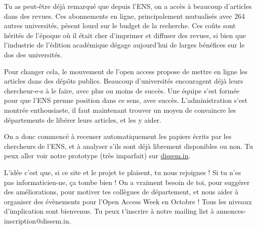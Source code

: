 
Tu as peut-être déjà remarqué que depuis l'ENS, on a accès à beaucoup d'articles dans des revues. Ces abonnements en ligne, principalement mutualisés avec 264 autres universités, pèsent lourd sur le budget de la recherche. Ces coûts sont hérités de l'époque où il était cher d'imprimer et diffuser des revues, si bien que l'industrie de l'édition académique dégage aujourd'hui de larges bénéfices sur le dos des universités.

Pour changer cela, le mouvement de l'open access propose de mettre en ligne les articles dans des dépôts publics. Beaucoup d'universités encouragent déjà leurs chercheur-e-s à le faire, avec plus ou moins de succès. Une équipe s'est formée pour que l'ENS prenne position dans ce sens, avec succès. L'administration s'est montrée enthousiaste, il faut maintenant trouver un moyen de convaincre les départements de libérer leurs articles, et les y aider.

On a donc commencé à recenser automatiquement les papiers écrits par les chercheurs de l'ENS, et à analyser s'ils sont déjà librement disponibles ou non.
Tu peux aller voir notre prototype (très imparfait) sur \url{dissem.in}. 

L'idée c'est que, si ce site et le projet te plaisent, tu nous rejoignes ! Si tu n'es pas informaticien-ne, ça tombe bien ! On a vraiment besoin de toi, pour suggérer des améliorations, pour motiver tes collègues de département, et nous aider à organiser des évènements pour l'Open Access Week en Octobre ! Tous les niveaux d'implication sont bienvenus. Tu peux t'inscrire à notre mailing list à annonces-inscription@dissem.in.

\signature{pintoch et bThom pour l'équipe de dissemin - team@dissem.in}
